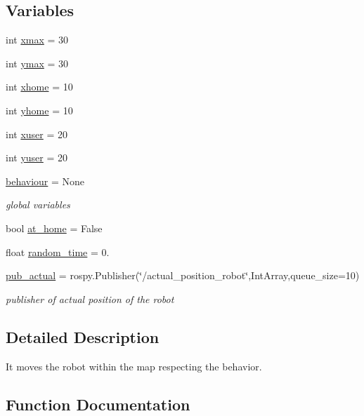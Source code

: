 \subsection*{Variables}
\begin{DoxyCompactItemize}
\item 
int \hyperlink{namespacemotion_ad15e7b7b1c76162401252ee7533515a4}{xmax} = 30
\item 
int \hyperlink{namespacemotion_a93496959e7cd7b64c958600e13052b02}{ymax} = 30
\item 
int \hyperlink{namespacemotion_a8e0cdf80e6970df1d82ccd96e3f68a1a}{xhome} = 10
\item 
int \hyperlink{namespacemotion_ad24c81915bdf6ae465698c9f63e0c419}{yhome} = 10
\item 
int \hyperlink{namespacemotion_ac1191b288873954280855513ee9ed701}{xuser} = 20
\item 
int \hyperlink{namespacemotion_ae750031c9c1b1e4435481bee11eaf94e}{yuser} = 20
\item 
\hyperlink{namespacemotion_a15d63b2a70ac940f179085ce72871c86}{behaviour} = None
\begin{DoxyCompactList}\small\item\em global variables \end{DoxyCompactList}\item 
bool \hyperlink{namespacemotion_a30e58643e988d1faddb84cdfd54965f8}{at\+\_\+home} = False
\item 
float \hyperlink{namespacemotion_a577a5f71c1bdf849f48eed17c4134bee}{random\+\_\+time} = 0.
\item 
\hyperlink{namespacemotion_a9213de80f34f408518c9265ee283b588}{pub\+\_\+actual} = rospy.\+Publisher(\char`\"{}/actual\+\_\+position\+\_\+robot\char`\"{},Int\+Array,queue\+\_\+size=10)
\begin{DoxyCompactList}\small\item\em publisher of actual position of the robot \end{DoxyCompactList}\end{DoxyCompactItemize}


\subsection{Detailed Description}
It moves the robot within the map respecting the behavior. 

\subsection{Function Documentation}
